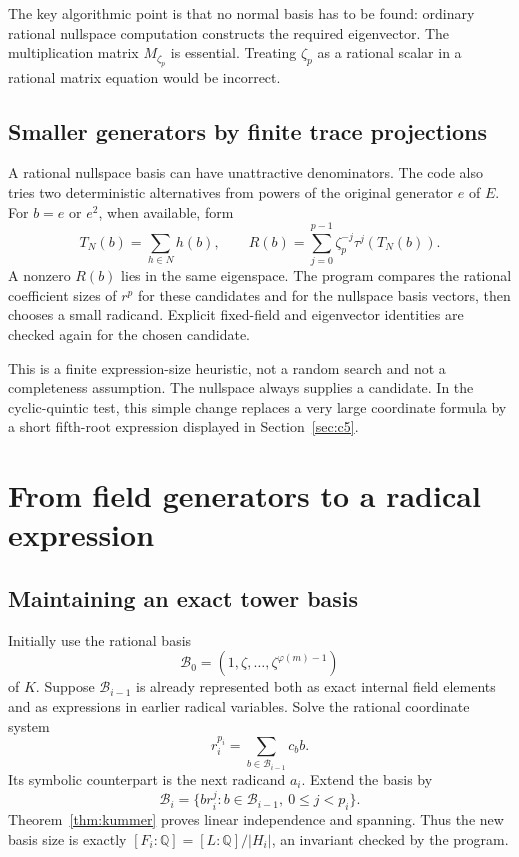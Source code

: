 \documentclass[11pt,a4paper]{article}
\theoremstyle{definition}\newtheorem{definition}[theorem]{Definition}
\theoremstyle{remark}\newtheorem{remark}[theorem]{Remark}
\newcommand{\Q}{\mathbb Q}\newcommand{\C}{\mathbb C}
\begin{document}
The key algorithmic point is that no normal basis has to be found: ordinary
rational nullspace computation constructs the required eigenvector. The
multiplication matrix $M_{\zeta_p}$ is essential. Treating $\zeta_p$ as a
rational scalar in a rational matrix equation would be incorrect.

\subsection{Smaller generators by finite trace projections}
A rational nullspace basis can have unattractive denominators. The code also
tries two deterministic alternatives from powers of the original generator
$e$ of $E$. For $b=e$ or $e^2$, when available, form
\[
 T_N(b)=\sum_{h\in N}h(b),\qquad
 R(b)=\sum_{j=0}^{p-1}\zeta_p^{-j}\tau^j(T_N(b)).
\]
A nonzero $R(b)$ lies in the same eigenspace. The program compares the
rational coefficient sizes of $r^p$ for these candidates and for the
nullspace basis vectors, then chooses a small radicand. Explicit fixed-field
and eigenvector identities are checked again for the chosen candidate.

This is a finite expression-size heuristic, not a random search and not a
completeness assumption. The nullspace always supplies a candidate. In the
cyclic-quintic test, this simple change replaces a very large coordinate
formula by a short fifth-root expression displayed in Section~\ref{sec:c5}.

\section{From field generators to a radical expression}
\subsection{Maintaining an exact tower basis}
Initially use the rational basis
\[
 \mathcal B_0=(1,\zeta,\ldots,\zeta^{\varphi(m)-1})
\]
of $K$. Suppose $\mathcal B_{i-1}$ is already represented both as exact
internal field elements and as expressions in earlier radical variables.
Solve the rational coordinate system
\[
 r_i^{p_i}=\sum_{b\in\mathcal B_{i-1}}c_b b.
\]
Its symbolic counterpart is the next radicand $a_i$. Extend the basis by
\[
 \mathcal B_i=\{b r_i^j:
              b\in\mathcal B_{i-1},\ 0\le j<p_i\}.
\]
Theorem~\ref{thm:kummer} proves linear independence and spanning. Thus the
new basis size is exactly $[F_i:\Q]=[L:\Q]/|H_i|$, an invariant checked
by the program.
\end{document}
